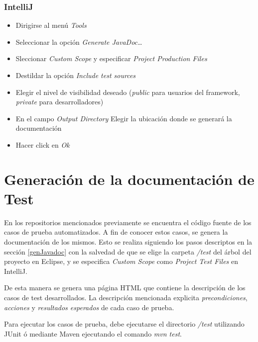 \subsubsection* {IntelliJ}
\begin{itemize}
  \item Dirigirse al menú \textit{Tools}
  \item Seleccionar la opción \textit{Generate JavaDoc\ldots}
  \item Sleccionar \textit{Custom Scope} y especificar \textit{Project
  Production Files}
  \item Destildar la opción \textit{Include test sources}
  \item Elegir el nivel de visibilidad deseado (\textit{public} para usuarios
  del framework, \textit{private} para desarrolladores)
  \item En el campo \textit{Output Directory} Elegir la ubicación donde se
  generará la documentación
  \item Hacer click en \textit{Ok}
\end{itemize}

\section{Generación de la documentación de Test}
En los repositorios mencionados previamente se encuentra el código fuente de los
casos de prueba automatizados. A fin de conocer estos casos, se genera la
documentación de los mismos.
Esto se realiza siguiendo los pasos descriptos en la sección \ref{genJavadoc}
con la salvedad de que se elige la carpeta \textit{/test} del árbol del proyecto
en Eclipse, y se especifica \textit{Custom Scope} como \textit{Project
  Test Files} en IntelliJ.

De esta manera se genera una página HTML que contiene la descripción de los casos
de test desarrollados. La descripción mencionada explicita
\textit{precondiciones}, \textit{acciones} y \textit{resultados esperados} de
cada caso de prueba.

Para ejecutar los casos de prueba, debe ejecutarse el directorio \textit{/test}
utilizando JUnit ó mediante Maven ejecutando el comando \textit{mvn test}.
